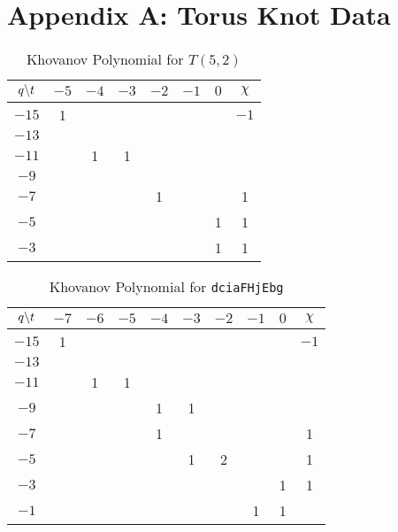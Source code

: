 \documentclass{article}
\theoremstyle{plain}
\begin{document}
    \section{Appendix A: Torus Knot Data}
        \begin{table}[H]
            \centering
            \begin{tabular}{| c | c | c | c | c | c | c | c |}
                \hline
                $q\symbol{92}t$&$-5$&$-4$&$-3$&$-2$&$-1$&$0$&$\chi$\\
                \hline
                $-15$&1&&&&&&$-1$\\
                \hline
                $-13$&&&&&&&\\
                \hline
                $-11$&&1&1&&&&\\
                \hline
                $-9$&&&&&&&\\
                \hline
                $-7$&&&&1&&&1\\
                \hline
                $-5$&&&&&&1&1\\
                \hline
                $-3$&&&&&&1&1\\
                \hline
            \end{tabular}
            \caption{Khovanov Polynomial for $T(5,2)$}
            \label{table:t_2_5_kho}
        \end{table}
        \begin{table}[H]
            \centering
            \begin{tabular}{| c | c | c | c | c | c | c | c | c | c |}
                \hline
                $q\symbol{92}t$&$-7$&$-6$&$-5$&$-4$&$-3$&$-2$&$-1$&$0$&$\chi$\\
                \hline
                $-15$&1&&&&&&&&$-1$\\
                \hline
                $-13$&&&&&&&&&\\
                \hline
                $-11$&&1&1&&&&&&\\
                \hline
                $-9$&&&&1&1&&&&\\
                \hline
                $-7$&&&&1&&&&&1\\
                \hline
                $-5$&&&&&1&2&&&1\\
                \hline
                $-3$&&&&&&&&1&1\\
                \hline
                $-1$&&&&&&&1&1&\\
                \hline
            \end{tabular}
            \caption{Khovanov Polynomial for \texttt{dciaFHjEbg}}
            \label{table:dciaFHjEbg_kho}
        \end{table}
\end{document}
